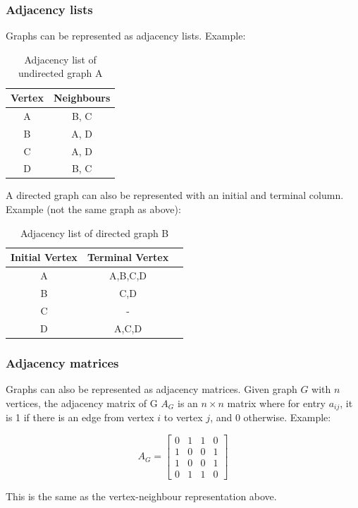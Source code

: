 \subsubsection{Adjacency lists}
Graphs can be represented as adjacency lists. Example:
\begin{table}[H]
    \begin{center}
        \begin{tabular}{c|c}
            Vertex & Neighbours \\
            \hline
            A & B, C \\
            B & A, D \\
            C & A, D \\
            D & B, C
        \end{tabular}
    \end{center}
    \caption{Adjacency list of undirected graph A}
\end{table}
A directed graph can also be represented with an initial and terminal column. 
Example (not the same graph as above):
\begin{table}[H]
    \begin{center}
        \begin{tabular}{c|c|c}
            Initial Vertex & Terminal Vertex \\
            \hline
            A & A,B,C,D \\
            B & C,D \\
            C & - \\
            D & A,C,D
        \end{tabular}
    \end{center}
    \caption{Adjacency list of directed graph B}
\end{table}

\subsubsection{Adjacency matrices}

Graphs can also be represented as adjacency matrices. 
Given graph $G$ with $n$ vertices, the adjacency matrix of G $A_G$ is an $n \times n$ matrix where for entry $a_{ij}$, it is 1 if there is an edge from vertex $i$ to vertex $j$, and 0 otherwise.
Example:
\begin{table}[H]
    \[
        A_G =
        \begin{bmatrix}
            0 & 1 & 1 & 0 \\
            1 & 0 & 0 & 1 \\
            1 & 0 & 0 & 1 \\
            0 & 1 & 1 & 0
        \end{bmatrix}
    \]
    \caption{Adjacency matrix of undirected graph A}
\end{table}
This is the same as the vertex-neighbour representation above.

